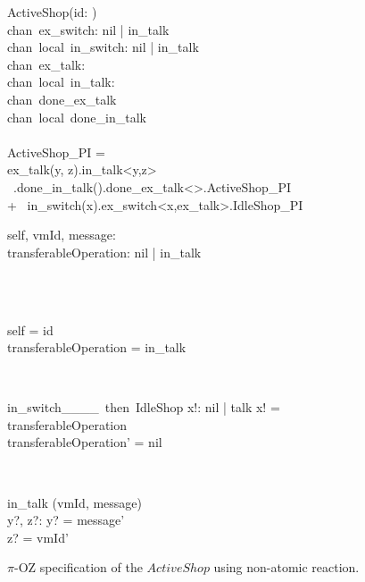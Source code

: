 \begin{figure}[H]
\centering
\begin{class}{ActiveShop(id: \integer)}
\ 
\\chan\ ex\_switch: nil | in\_talk
\ 
\\chan\ local\ in\_switch: nil | in\_talk
\ 
\\chan\ ex\_talk:\integer \times \integer
\ 
\\chan\ local\ in\_talk:\integer \times \integer
\ 
\\chan\ done\_ex\_talk
\ 
\\chan\ local\ done\_in\_talk
\ \\ \
\\ActiveShop\_PI = 
\\ \qquad ex\_talk(y, z).in\_talk<y,z>
\\ \ \qquad \qquad \qquad .done\_in\_talk().done\_ex\_talk<>.ActiveShop\_PI 
\\ \qquad + \ in\_switch(x).ex\_switch<x,ex\_talk>.IdleShop\_PI
\\\begin{state}
self, vmId, message: \integer
\\transferableOperation: nil | in\_talk
\end{state} 
\\
\begin{init}
\\self = id
\\transferableOperation = in\_talk
\end{init} 
\\
\begin{op}{in\_switch\_\_\_\_\ then\ IdleShop}
x!: nil | talk
\ST
x! = transferableOperation
\\transferableOperation' = nil
\end{op}
\\
\begin{op}{in\_talk}
\Delta (vmId, message)
\\y?, z?: \integer
\ST
y? = message'
\\z? = vmId'
\end{op}
\end{class}
\caption{$\pi$-OZ specification of the $ActiveShop$ using non-atomic reaction.}
\label{comp_oz_pi_statefull_activeShop_non_atomic}
\end{figure}